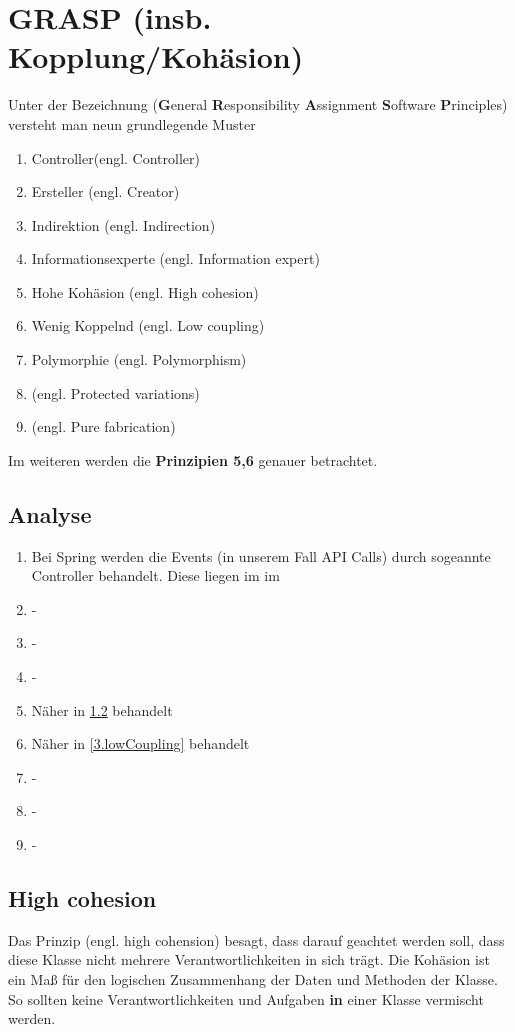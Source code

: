 	\section{GRASP (insb. Kopplung/Kohäsion)}
	Unter der Bezeichnung  (\textbf{G}eneral \textbf{R}esponsibility \textbf{A}ssignment \textbf{S}oftware \textbf{P}rinciples) versteht man neun grundlegende Muster
	\begin{enumerate}
		\item Controller(engl. Controller)
		\item Ersteller (engl. Creator)
		\item Indirektion (engl. Indirection)
		\item Informationsexperte (engl. Information expert)
		\item Hohe Kohäsion (engl. High cohesion)
		\item Wenig Koppelnd (engl. Low coupling)
		\item Polymorphie (engl. Polymorphism)
		\item (engl. Protected variations)
		\item (engl. Pure fabrication)
	\end{enumerate}
	Im weiteren werden die \textbf{Prinzipien 5,6} genauer betrachtet.
		
	\newpage
		
		\subsection{Analyse}
		\begin{enumerate}
			\item Bei Spring werden die Events (in unserem Fall API Calls) durch sogeannte Controller behandelt. Diese liegen im  im 
			\item -
			\item -
			\item -
			\item Näher in \cref{3.highCohesion} behandelt
			\item Näher in \cref{3.lowCoupling} behandelt
			\item -
			\item -
			\item -
 		\end{enumerate}
	
			\subsection{High cohesion \cite{kohaesion.google}} \label{3.highCohesion}
			Das Prinzip  (engl. high cohension) besagt, dass darauf geachtet werden soll, dass diese Klasse nicht mehrere Verantwortlichkeiten in sich trägt. Die Kohäsion ist ein Maß für den logischen Zusammenhang der Daten und Methoden der Klasse. So sollten keine Verantwortlichkeiten und Aufgaben \textbf{in} einer Klasse vermischt werden.
